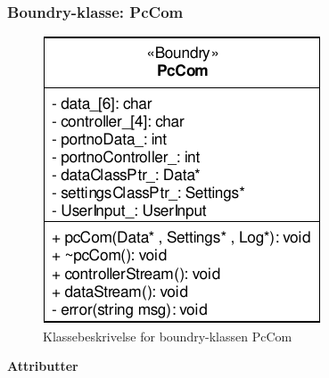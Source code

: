 \subsubsection{Boundry-klasse: PcCom}

\begin{figure}[h]
\centering
\includegraphics[]{../fig/diagrammer/bil/cd_pccom.pdf}
\caption{Klassebeskrivelse for boundry-klassen PcCom}
\label{fig:cd_pccom}
\end{figure}

\textbf{Attributter}

